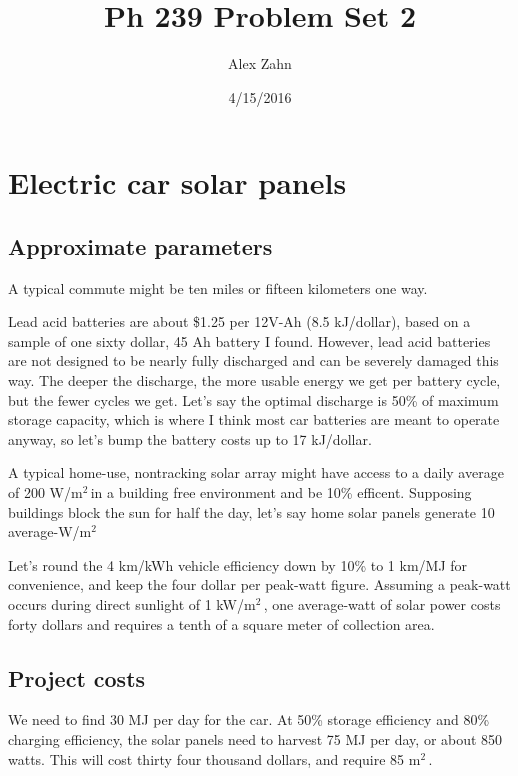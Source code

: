 \documentclass[12pt]{article}
\title{Ph 239 Problem Set 2}
\author{Alex Zahn}
\date{4/15/2016}
\begin{document}
\maketitle

\newcommand{\wmsq}{W/\(\mathrm{m}^2\,\)}
\newcommand{\msq}{\(\mathrm{m}^2\,\)}
\newcommand{\micron}{\(\mu\mathrm{m}\)\,}
\newcommand{\mcb}{\(\mathrm{m}^3\,\)}

\section{Electric car solar panels}

\subsection{Approximate parameters}

A typical commute might be ten miles or fifteen kilometers one way.


Lead acid batteries are about \$1.25 per 12V-Ah (8.5 kJ/dollar), based on a sample of one sixty dollar, 45 Ah battery I found. However, lead acid batteries are not designed to be nearly fully discharged and can be severely damaged this way. The deeper the discharge, the more usable energy we get per battery cycle, but the fewer cycles we get. Let's say the optimal discharge is 50\% of maximum storage capacity, which is where I think most car batteries are meant to operate anyway, so let's bump the battery costs up to 17 kJ/dollar.


A typical home-use, nontracking solar array might have access to a daily average of 200 \wmsq in a building free environment and be 10\% efficent. Supposing buildings block the sun for half the day, let's say home solar panels generate 10 average-\wmsq 
 
Let's round the 4 km/kWh vehicle efficiency down by 10\% to 1 km/MJ for convenience, and keep the four dollar per peak-watt figure. Assuming a peak-watt occurs during direct sunlight of 1 k\wmsq, one average-watt of solar power costs forty dollars and requires a tenth of a square meter of collection area.

\subsection{Project costs}

We need to find 30 MJ per day for the car. At 50\% storage efficiency and 80\% charging efficiency, the solar panels need to harvest 75 MJ per day, or about 850 watts. This will cost thirty four thousand dollars, and require 85 \msq.
\end{document}
